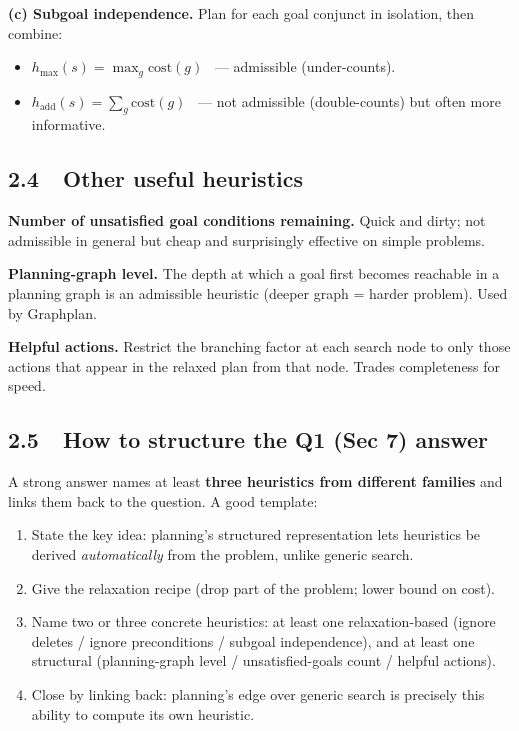 \documentclass[11pt,a4paper]{article}
\begin{document}
\textbf{(c) Subgoal independence.} Plan for each goal conjunct in isolation, then combine:
\begin{itemize}[leftmargin=*,itemsep=0pt]
  \item $h_{\max}(s) = \max_g \mathrm{cost}(g)$ \ --- admissible (under-counts).
  \item $h_{\text{add}}(s) = \sum_g \mathrm{cost}(g)$ \ --- not admissible (double-counts) but often more informative.
\end{itemize}

\subsection*{2.4\ \ Other useful heuristics}

\textbf{Number of unsatisfied goal conditions remaining.} Quick and dirty; not admissible in general but cheap and surprisingly effective on simple problems.

\textbf{Planning-graph level.} The depth at which a goal first becomes reachable in a planning graph is an admissible heuristic (deeper graph = harder problem). Used by Graphplan.

\textbf{Helpful actions.} Restrict the branching factor at each search node to only those actions that appear in the relaxed plan from that node. Trades completeness for speed.

\subsection*{2.5\ \ How to structure the Q1 (Sec 7) answer}

A strong answer names at least \textbf{three heuristics from different families} and links them back to the question. A good template:

\begin{enumerate}[leftmargin=*,itemsep=1pt]
  \item State the key idea: planning's structured representation lets heuristics be derived \emph{automatically} from the problem, unlike generic search.
  \item Give the relaxation recipe (drop part of the problem; lower bound on cost).
  \item Name two or three concrete heuristics: at least one relaxation-based (ignore deletes / ignore preconditions / subgoal independence), and at least one structural (planning-graph level / unsatisfied-goals count / helpful actions).
  \item Close by linking back: planning's edge over generic search is precisely this ability to compute its own heuristic.
\end{enumerate}
\end{document}
